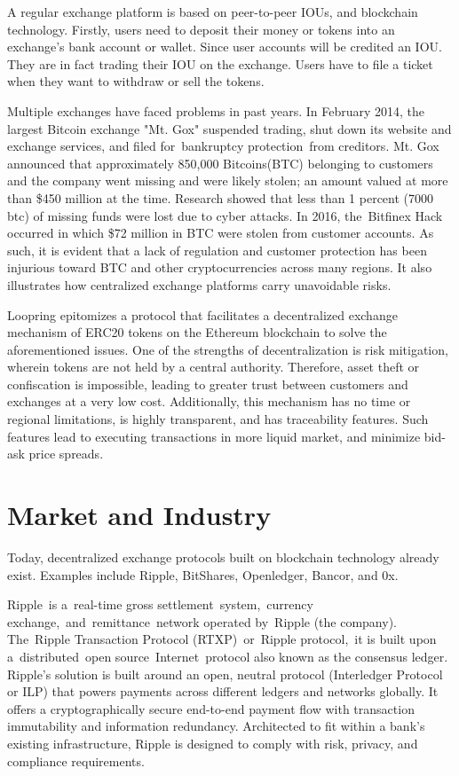 \documentclass[UTF8,nofonts]{article}
\begin{document}
A regular exchange platform is based on peer-to-peer IOUs, and blockchain technology. Firstly,  users need to deposit their money or tokens into an exchange's bank account or wallet. Since user accounts will be credited an IOU. They are in fact trading their IOU on the exchange. Users have to file a ticket when they want to withdraw or sell the tokens.

Multiple exchanges have faced problems in past years. In February 2014, the largest Bitcoin exchange "Mt. Gox" suspended trading,  shut down its website and exchange services, and filed for bankruptcy protection from creditors\cite{mcmillan2014inside}. Mt. Gox announced that approximately 850,000 Bitcoins(BTC) belonging to customers and the company went missing and were likely stolen; an amount valued at more than \$450 million at the time. Research showed that less than 1 percent (7000 btc) of missing funds were lost due to cyber attacks. In 2016, the Bitfinex Hack occurred in which \$72 million in BTC were stolen from customer accounts. As such, it is evident that a lack of regulation and customer protection has been injurious toward BTC and other cryptocurrencies across many regions. It also illustrates how centralized exchange platforms carry unavoidable risks.

Loopring epitomizes a protocol that facilitates a decentralized exchange mechanism of ERC20 tokens on the Ethereum blockchain to solve the aforementioned issues. One of the strengths of decentralization is risk mitigation, wherein tokens are not held by a central authority. Therefore, asset theft or confiscation is impossible, leading to greater trust between customers and exchanges at a very low cost. Additionally, this mechanism has no time or regional limitations, is highly transparent, and has traceability features. Such features lead to executing transactions in more liquid market, and minimize bid-ask price spreads.

\section{Market and Industry\label{sec: existingworks}}

Today, decentralized exchange protocols built on blockchain technology already exist. Examples include Ripple, BitShares, Openledger, Bancor, and 0x.

Ripple\cite{schwartz2014ripple} is a real-time gross settlement system, currency exchange, and remittance network operated by Ripple (the company). The Ripple Transaction Protocol (RTXP) or Ripple protocol, it is built upon a distributed open source Internet protocol also known as the consensus ledger. Ripple's solution is built around an open, neutral protocol (Interledger Protocol or ILP\cite{thomas2015protocol}) that powers payments across different ledgers and networks globally. It offers a cryptographically secure end-to-end payment flow with transaction immutability and information redundancy. Architected to fit within a bank's existing infrastructure, Ripple is designed to comply with risk, privacy, and compliance requirements.
\end{document}
